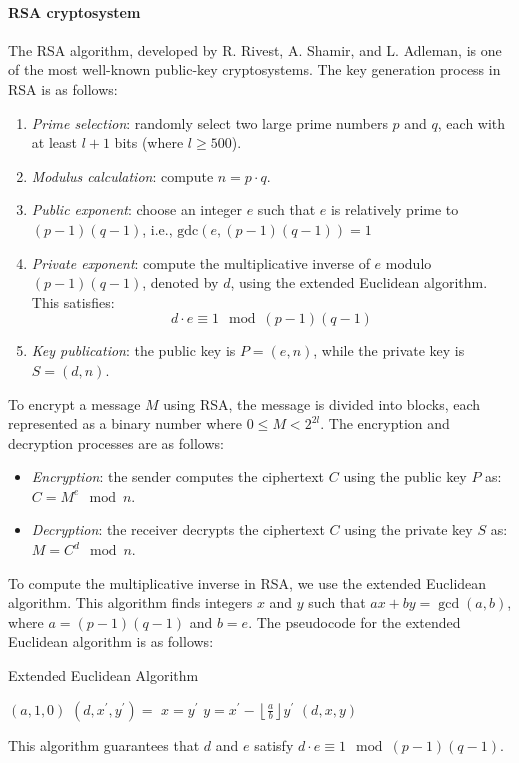\paragraph*{RSA cryptosystem}
The RSA algorithm, developed by R. Rivest, A. Shamir, and L. Adleman, is one of the most well-known public-key cryptosystems. 
The key generation process in RSA is as follows:
\begin{enumerate}
    \item \textit{Prime selection}: randomly select two large prime numbers $p$ and $q$, each with at least $l+1$ bits (where $l \geq 500$).
    \item \textit{Modulus calculation}: compute $n = p \cdot q$.
    \item \textit{Public exponent}: choose an integer $e$ such that $e$ is relatively prime to $(p-1)(q-1)$, i.e., $\text{gdc}(e, (p-1)(q-1)) = 1$
    \item \textit{Private exponent}: compute the multiplicative inverse of $e$ modulo $(p-1)(q-1)$, denoted by $d$, using the extended Euclidean algorithm. 
        This satisfies:
        \[d \cdot e \equiv 1  \mod  (p-1)(q-1)\]
    \item \textit{Key publication}: the public key is $P = (e, n)$, while the private key is $S = (d, n)$.
\end{enumerate}
To encrypt a message $M$ using RSA, the message is divided into blocks, each represented as a binary number where $0 \leq M < 2^{2l}$. 
The encryption and decryption processes are as follows:
\begin{itemize}
    \item \textit{Encryption}: the sender computes the ciphertext $C$ using the public key $P$ as:$C = M^e \mod n$. 
    \item \textit{Decryption}: the receiver decrypts the ciphertext $C$ using the private key $S$ as: $M = C^d \mod n$.
\end{itemize}
To compute the multiplicative inverse in RSA, we use the extended Euclidean algorithm. 
This algorithm finds integers $x$ and $y$ such that $ax + by = \gcd(a, b)$, where $a = (p-1)(q-1)$ and $b = e$. 
The pseudocode for the extended Euclidean algorithm is as follows:
\begin{algorithm}[H]
    \caption{Extended Euclidean Algorithm}
    \begin{algorithmic}[1]
                \State \Return $(a, 1, 0)$
            \EndIf
            \State $(d, x^\prime, y^\prime) = $ 
            \State $x = y^\prime$
            \State $y = x^\prime - \left\lfloor \frac{a}{b} \right\rfloor y^\prime$
            \State \Return $(d, x, y)$
        \EndFunction
    \end{algorithmic}
\end{algorithm}
This algorithm guarantees that $d$ and $e$ satisfy $d \cdot e \equiv 1 \mod  (p-1)(q-1)$. 